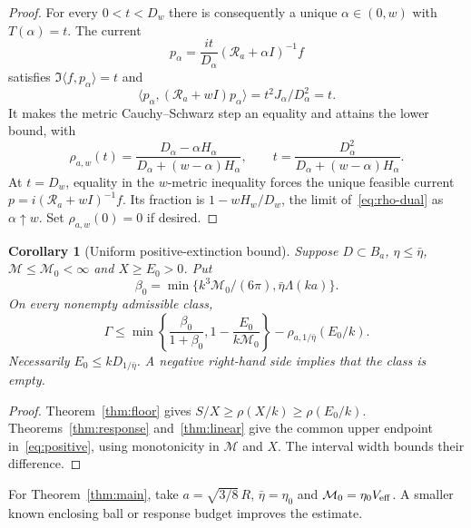 \documentclass[11pt]{article}
\newtheorem{corollary}[theorem]{Corollary}
\newcommand{\ip}[2]{\langle #1,#2\rangle}
\begin{document}
\begin{proof}
For every $0<t<D_w$ there is consequently a unique $\alpha\in(0,w)$ with $T(\alpha)=t$. The current
\begin{equation}\label{eq:optimizer}
 p_\alpha=\frac{it}{D_\alpha}(\mathcal R_a+\alpha I)^{-1}f
\end{equation}
satisfies $\Im\ip f{p_\alpha}=t$ and
\[
 \ip{p_\alpha}{(\mathcal R_a+wI)p_\alpha}
 =t^2J_\alpha/D_\alpha^2=t.
\]
It makes the metric Cauchy--Schwarz step an equality and attains the lower bound, with
\begin{equation}\label{eq:rho-primal}
 \rho_{a,w}(t)=\frac{D_\alpha-\alpha H_\alpha}{D_\alpha+(w-\alpha)H_\alpha},
 \qquad t=\frac{D_\alpha^2}{D_\alpha+(w-\alpha)H_\alpha}.
\end{equation}
At $t=D_w$, equality in the $w$-metric inequality forces the unique feasible current $p=i(\mathcal R_a+wI)^{-1}f$. Its fraction is $1-wH_w/D_w$, the limit of~\eqref{eq:rho-dual} as $\alpha\uparrow w$. Set $\rho_{a,w}(0)=0$ if desired.
\end{proof}

\begin{corollary}[Uniform positive-extinction bound]\label{cor:positive}
Suppose $D\subset B_a$, $\eta\leq\bar\eta$, $\mathcal M\leq\mathcal M_0<\infty$ and $X\geq E_0>0$. Put
\[
 \beta_0=\min\{k^3\mathcal M_0/(6\pi),\bar\eta\Lambda(ka)\}.
\]
On every nonempty admissible class,
\begin{equation}\label{eq:positive}
 \Gamma\leq\min\left\{\frac{\beta_0}{1+\beta_0},
                          1-\frac{E_0}{k\mathcal M_0}\right\}
             -\rho_{a,1/\bar\eta}(E_0/k).
\end{equation}
Necessarily $E_0\leq kD_{1/\bar\eta}$. A negative right-hand side implies that the class is empty.
\end{corollary}
\begin{proof}
Theorem~\ref{thm:floor} gives $S/X\geq\rho(X/k)\geq\rho(E_0/k)$. Theorems~\ref{thm:response} and~\ref{thm:linear} give the common upper endpoint in~\eqref{eq:positive}, using monotonicity in $\mathcal M$ and $X$. The interval width bounds their difference.
\end{proof}
For Theorem~\ref{thm:main}, take $a=\sqrt{3/8}\,R$, $\bar\eta=\eta_0$ and $\mathcal M_0=\eta_0V_{\rm eff}$. A smaller known enclosing ball or response budget improves the estimate.
\end{document}
